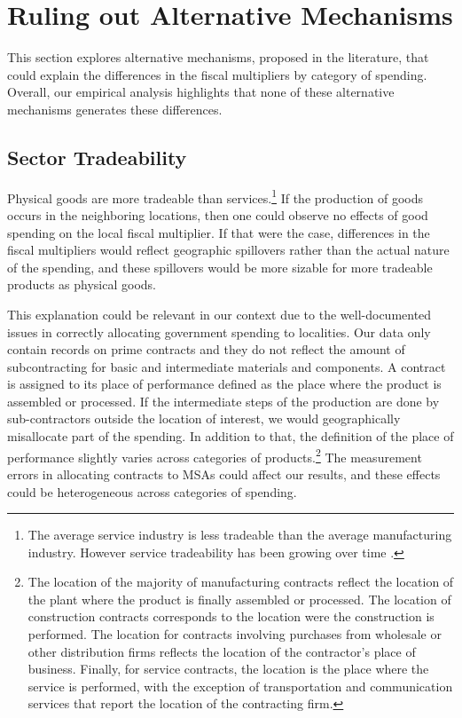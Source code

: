\documentclass[dv_diss_main.tex]{subfiles}
\begin{document}


\section{Ruling out Alternative Mechanisms}
\label{sec:emp_mec}


This section explores alternative mechanisms, proposed in the literature, that could explain the differences in the fiscal multipliers by category of spending. Overall, our empirical analysis highlights that none of these alternative mechanisms generates these differences.

\subsection{Sector Tradeability}\label{subsec:outflow}


Physical goods are more tradeable than services.\footnote{The average service industry is less tradeable than the average manufacturing industry. However service tradeability has been growing over time \citep{gervais2019tradability}.} If the production of goods occurs in the neighboring locations, then one could observe no effects of good spending on the local fiscal multiplier. If that were the case, differences in the fiscal multipliers would reflect geographic spillovers rather than the actual nature of the spending, and these spillovers would be more sizable for more tradeable products as physical goods.

This explanation could be relevant in our context due to the well-documented issues in correctly allocating government spending to localities. Our data only contain records on prime contracts and they do not reflect the amount of subcontracting for basic and intermediate materials and components. A contract is assigned to its place of performance defined as the place where the product is assembled or processed. If the intermediate steps of the production  are done by sub-contractors outside the location of interest, we would geographically misallocate part of the spending. In addition to that, the definition of the place of performance slightly varies across categories of products.\footnote{The location of the majority of manufacturing contracts reflect the location of the plant where the product is finally assembled or processed. The location of construction contracts corresponds to the location were the construction is performed. The location for contracts involving purchases from wholesale or other distribution firms reflects the location of the contractor's place of business. Finally, for service contracts, the location is the place where the service is performed, with the exception of transportation and communication services that report the location of the contracting firm.} The measurement errors in allocating contracts to MSAs could affect our results, and these effects could be heterogeneous across categories of spending.
\end{document}
